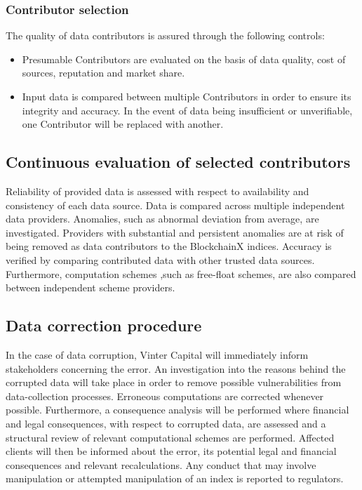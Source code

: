 \documentclass{article}
\begin{document}
\subsubsection{Contributor selection}\label{contributor-selection}

The quality of data contributors is assured through the following
controls:

\begin{itemize}
\item
  Presumable Contributors are evaluated on the basis of data quality,
  cost of sources, reputation and market share.
\item
  Input data is compared between multiple Contributors in order to
  ensure its integrity and accuracy. In the event of data being
  insufficient or unverifiable, one Contributor will be replaced with
  another.
\end{itemize}

\subsection{Continuous evaluation of selected
contributors}\label{continuous-evaluation-of-selected-contributors}

Reliability of provided data is assessed with respect to availability
and consistency of each data source. Data is compared across multiple
independent data providers. Anomalies, such as abnormal deviation from
average, are investigated. Providers with substantial and persistent
anomalies are at risk of being removed as data contributors to the
BlockchainX indices. Accuracy is verified by comparing contributed data
with other trusted data sources. Furthermore, computation schemes ,such
as free-float schemes, are also compared between independent scheme
providers.

\subsection{Data correction procedure}\label{data-correction-procedure}

In the case of data corruption, Vinter Capital will immediately inform
stakeholders concerning the error. An investigation into the reasons
behind the corrupted data will take place in order to remove possible
vulnerabilities from data-collection processes. Erroneous computations
are corrected whenever possible. Furthermore, a consequence analysis
will be performed where financial and legal consequences, with respect
to corrupted data, are assessed and a structural review of relevant
computational schemes are performed. Affected clients will then be
informed about the error, its potential legal and financial consequences
and relevant recalculations. Any conduct that may involve manipulation
or attempted manipulation of an index is reported to regulators.
\end{document}
